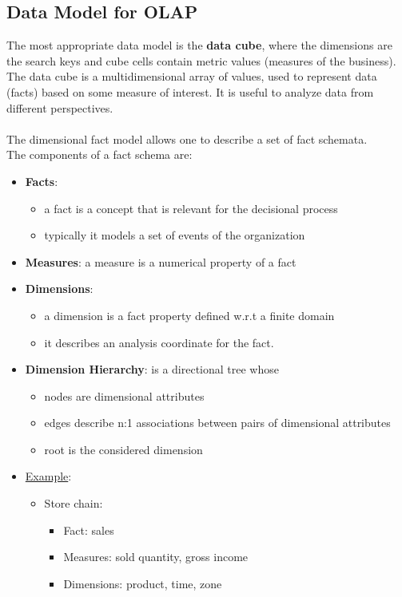 \documentclass[10pt,a4paper]{article}
\newcommand{\nline}{\\~\\}
\begin{document}
\subsection{Data Model for OLAP}
The most appropriate data model is the \textbf{data cube}, where the dimensions are the search keys and cube cells contain metric values (measures of the business). The data cube is a multidimensional array of values, used to represent data (facts) based on some measure of interest. It is useful to analyze data from different perspectives. \nline
The dimensional fact model allows one to describe a set of fact schemata. \\
The components of a fact schema are:
\begin{itemize}
	\item \textbf{Facts}: 
	\begin{itemize}
		\item a fact is a concept that is relevant for the decisional process
		\item typically it models a set of events of the organization
	\end{itemize}
	\item \textbf{Measures}: a measure is a numerical property of a fact
	\item \textbf{Dimensions}:
	\begin{itemize}
		\item a dimension is a fact property defined w.r.t a finite domain
		\item it describes an analysis coordinate for the fact.
	\end{itemize}
	\item \textbf{Dimension Hierarchy}: is a directional tree whose
	\begin{itemize}
		\item nodes are dimensional attributes
		\item edges describe n:1 associations between pairs of dimensional attributes
		\item root is the considered dimension
\end{itemize}
	\item \uline{Example}:
	\begin{itemize}
		\item Store chain:
		\begin{itemize}
			\item Fact: sales
			\item Measures: sold quantity, gross income
			\item Dimensions: product, time, zone
		\end{itemize}
	\end{itemize}
\end{itemize}
\end{document}

